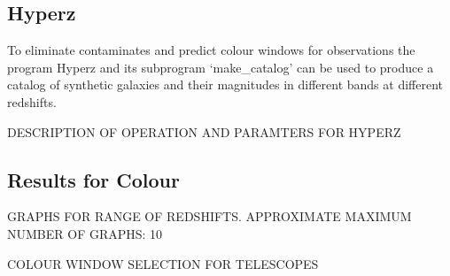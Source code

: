 
    \subsection{Hyperz} %
	\label{sub:Hyperz} 

To eliminate contaminates and predict colour windows for observations the program Hyperz and its subprogram ‘make_catalog’ can be used to produce a catalog of synthetic galaxies and their magnitudes in different bands at different redshifts. 

DESCRIPTION OF OPERATION AND PARAMTERS FOR HYPERZ


\subsection{Results for Colour} %
	\label{sub:Results_for_Colour}
 
GRAPHS FOR RANGE OF REDSHIFTS. APPROXIMATE MAXIMUM NUMBER OF GRAPHS: 10

COLOUR WINDOW SELECTION FOR TELESCOPES

